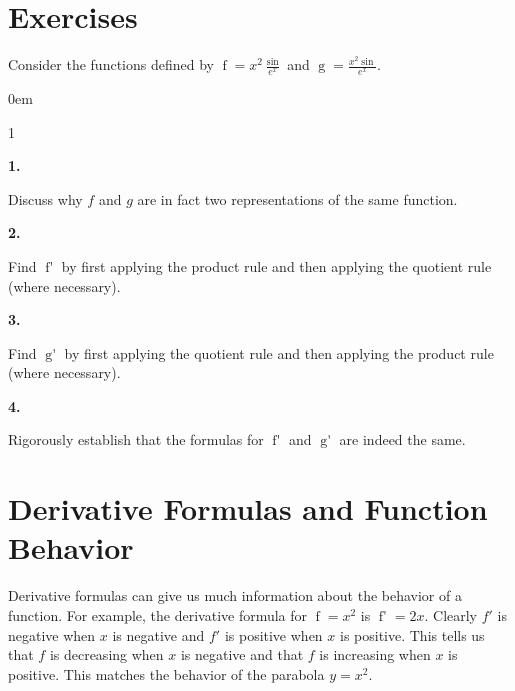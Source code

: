 \documentclass[12pt,]{book}
\theoremstyle{plain}
\theoremstyle{definition}
\numberwithin{equation}{section}
\newenvironment{exercisegroup}%
{\medskip\noindent}%
{\par\bigskip}%
\newlength{\exercisegroupindent}%
\newlength{\exercisegroupitemwidth}%
\newenvironment{exercisegrouplist}%
{\vspace{-\partopsep}%
\begin{adjustwidth}{\exercisegroupindent}{0em}}%
{\end{adjustwidth}%
\vspace{-\partopsep}%
\vspace{\baselineskip}}%
\newenvironment{exercisegroupbycol}[1]%
{\begin{exercisegrouplist}%
\vspace{-\multicolsep}%
\begin{multicols}{#1}%
\setlength{\parindent}{0em}%
\setlength{\exercisegroupitemwidth}{\linewidth}}%
{\end{multicols}%
\vspace{-\multicolsep}%
\end{exercisegrouplist}}%
\newenvironment{exercisegroupitem}[1]%
{\begin{minipage}[t]{\exercisegroupitemwidth}
\vspace{0pt}%
{\bfseries#1}%
\rule{0pt}{\baselineskip}}{\strut%
\end{minipage}%
\hspace{\columnsep}}%
\providecommand\phantomsection{}
\newcommand{\fe}[2]{\mathop{{#1}{\left(#2\right)}}}
\newcommand{\fd}[1]{#1'}
\begin{document}
\section*{Exercises}\label{exercises-36}

\begin{exercisegroup}%
Consider the functions defined by \(\fe{f}{x}=x^2\frac{\fe{\sin}{x}}{e^x}\) and \(\fe{g}{x}=\frac{x^2\fe{\sin}{x}}{e^x}\).%
\begin{exercisegroupbycol}{1}%
\begin{exercisegroupitem}{1. }\phantomsection\hypertarget{exercise-268}{\null}
Discuss why \(f\) and \(g\) are in fact two representations of the same function.%
\end{exercisegroupitem}%
\par%
\begin{exercisegroupitem}{2. }\phantomsection\hypertarget{exercise-269}{\null}
Find \(\fe{\fd{f}}{x}\) by first applying the product rule and then applying the quotient rule (where necessary).%
\end{exercisegroupitem}%
\par%
\begin{exercisegroupitem}{3. }\phantomsection\hypertarget{exercise-270}{\null}
Find \(\fe{\fd{g}}{x}\) by first applying the quotient rule and then applying the product rule (where necessary).%
\end{exercisegroupitem}%
\par%
\begin{exercisegroupitem}{4. }\phantomsection\hypertarget{exercise-271}{\null}
Rigorously establish that the formulas for \(\fe{\fd{f}}{x}\) and \(\fe{\fd{g}}{x}\) are indeed the same.%
\end{exercisegroupitem}%
\par%
\end{exercisegroupbycol}%
\end{exercisegroup}%
\typeout{************************************************}
\typeout{************************************************}
\section[Derivative Formulas and Function Behavior]{Derivative Formulas and Function Behavior}\label{section-derivative-formulas-and-function-behavior}
Derivative formulas can give us much information about the behavior of a function.  For example, the derivative formula for \(\fe{f}{x}=x^2\) is \(\fe{\fd{f}}{x}=2x\).  Clearly \(\fd{f}\) is negative when \(x\) is negative and \(\fd{f}\) is positive when \(x\) is positive.  This tells us that \(f\) is decreasing when \(x\) is negative and that \(f\) is increasing when \(x\) is positive.  This matches the behavior of the parabola \(y=x^2\).%
\typeout{************************************************}
\typeout{************************************************}
\end{document}
